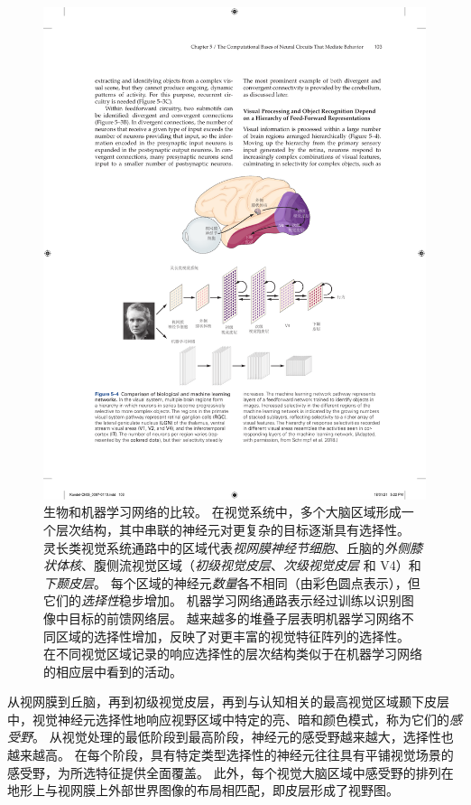 \begin{figure}[htbp]
	\centering
	\includegraphics[width=1.0\linewidth]{chap05/fig_5_4}
	\caption{生物和机器学习网络的比较。
		在视觉系统中，多个大脑区域形成一个层次结构，其中串联的神经元对更复杂的目标逐渐具有选择性。
		灵长类视觉系统通路中的区域代表\textit{视网膜神经节细胞}、丘脑的\textit{外侧膝状体核}、腹侧流视觉区域（\textit{初级视觉皮层}、\textit{次级视觉皮层} 和 V4）和\textit{下颞皮层}。
		每个区域的神经元\textit{数量}各不相同（由彩色圆点表示），但它们的\textit{选择性}稳步增加。
		机器学习网络通路表示经过训练以识别图像中目标的前馈网络层。
		越来越多的堆叠子层表明机器学习网络不同区域的选择性增加，反映了对更丰富的视觉特征阵列的选择性。
		在不同视觉区域记录的响应选择性的层次结构类似于在机器学习网络的相应层中看到的活动\cite{schrimpf2018brain}。}
	\label{fig:5_4}
\end{figure}



从视网膜到丘脑，再到初级视觉皮层，再到与认知相关的最高视觉区域颞下皮层中，视觉神经元选择性地响应视野区域中特定的亮、暗和颜色模式，称为它们的\textit{感受野}。
从视觉处理的最低阶段到最高阶段，神经元的感受野越来越大，选择性也越来越高。
在每个阶段，具有特定类型选择性的神经元往往具有平铺视觉场景的感受野，为所选特征提供全面覆盖。
此外，每个视觉大脑区域中感受野的排列在地形上与视网膜上外部世界图像的布局相匹配，即皮层形成了视野图。


